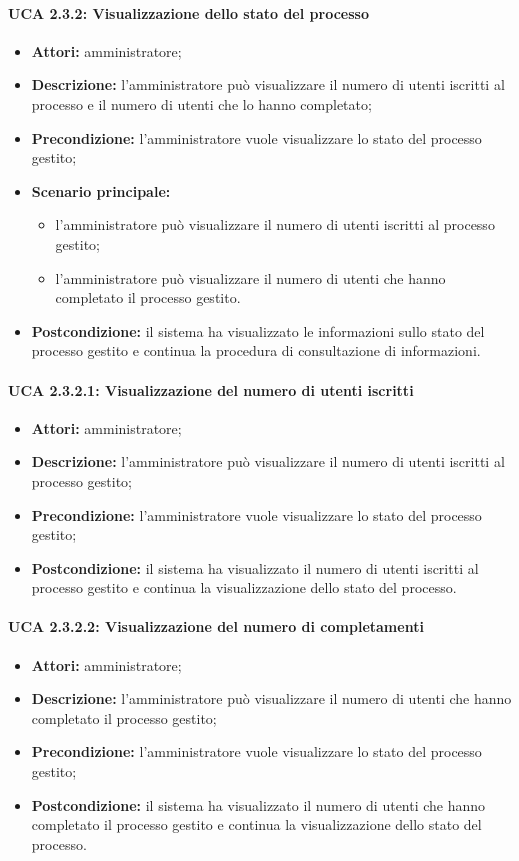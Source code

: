 \paragraph{UCA 2.3.2: Visualizzazione dello stato del processo}
\begin{itemize}
\item \textbf{Attori:} 
amministratore;
\item \textbf{Descrizione:} 
l'amministratore può visualizzare il numero di utenti iscritti al processo e il numero di utenti che lo hanno completato; 
\item \textbf{Precondizione:} 
l'amministratore vuole visualizzare lo stato del processo gestito;
\item \textbf{Scenario principale:} 
\begin{itemize}
\item l'amministratore può visualizzare il numero di utenti iscritti al processo gestito;
\item l'amministratore può visualizzare il numero di utenti che hanno completato il processo gestito.
\end{itemize}
\item \textbf{Postcondizione:} 
il sistema ha visualizzato le informazioni sullo stato del processo gestito e continua la procedura di consultazione di informazioni.
\end{itemize}

\paragraph{UCA 2.3.2.1: Visualizzazione del numero di utenti iscritti}
\begin{itemize}
\item \textbf{Attori:} 
amministratore;
\item \textbf{Descrizione:} 
l'amministratore può visualizzare il numero di utenti iscritti al processo gestito; 
\item \textbf{Precondizione:} 
l'amministratore vuole visualizzare lo stato del processo gestito;
\item \textbf{Postcondizione:} 
il sistema ha visualizzato il numero di utenti iscritti al processo gestito e continua la visualizzazione dello stato del processo.
\end{itemize}

\paragraph{UCA 2.3.2.2: Visualizzazione del numero di completamenti}
\begin{itemize}
\item \textbf{Attori:} 
amministratore;
\item \textbf{Descrizione:} 
l'amministratore può visualizzare il numero di utenti che hanno completato il processo gestito; 
\item \textbf{Precondizione:} 
l'amministratore vuole visualizzare lo stato del processo gestito;
\item \textbf{Postcondizione:} 
il sistema ha visualizzato il numero di utenti che hanno completato il processo gestito e continua la visualizzazione dello stato del processo.
\end{itemize}

